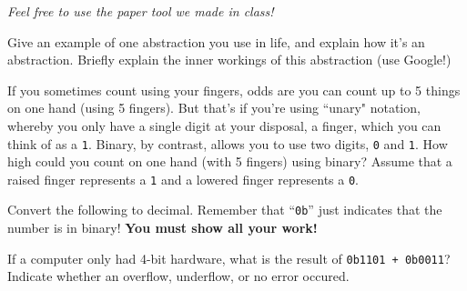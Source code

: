 \documentclass[addpoints, 12pt]{exam}
\begin{document}
\begin{center}\textit{Feel free to use the paper tool we made in class!}\end{center}

\begin{questions}

    \question Give an example of one abstraction you use in life, and explain how it's an abstraction.
    Briefly explain the inner workings of this abstraction (use Google!)
    \vfill
		
	\question If you sometimes count using your fingers, odds are you can count up to 5 things on one hand (using 5 fingers).
    But that's if you're using ``unary" notation, whereby you only have a single digit at your disposal, a finger, which you can think of as a \texttt{1}.
    Binary, by contrast, allows you to use two digits, \texttt{0} and \texttt{1}.
    How high could you count on one hand (with 5 fingers) using binary?
    Assume that a raised finger represents a \texttt{1} and a lowered finger represents a \texttt{0}.
	\vfill

	\question Convert the following to decimal. Remember that ``\texttt{0b}'' just indicates that the number is in binary!
    \textbf{You must show all your work!}
	

    \question If a computer only had 4-bit hardware, what is the result of \texttt{0b1101 + 0b0011}?
    Indicate whether an overflow, underflow, or no error occured.
    \vfill

\end{questions}
\end{document}
